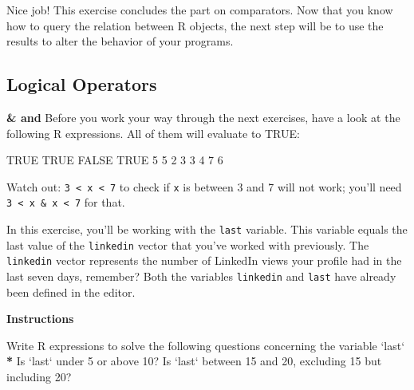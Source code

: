 \documentclass[]{article}
\newcommand{\hlnum}[1]{\textcolor[rgb]{0.816,0.125,0.439}{#1}}%
\newcommand{\hlstr}[1]{\textcolor[rgb]{0.251,0.627,0.251}{#1}}%
\newcommand{\hlstd}[1]{\textcolor[rgb]{0.251,0.251,0.251}{#1}}%
\newcommand{\hlkwc}[1]{\textcolor[rgb]{0.251,0.251,0.251}{#1}}%
\newenvironment{Shaded}{\begin{myshaded}}{\end{myshaded}}
\newcommand{\DataTypeTok}[1]{\hlkwc{#1}}
\newcommand{\DecValTok}[1]{\hlnum{#1}}
\newcommand{\StringTok}[1]{\hlstr{#1}}
\newcommand{\OtherTok}[1]{{#1}}
\newcommand{\ErrorTok}[1]{\textbf{{#1}}}
\newcommand{\NormalTok}[1]{\hlstd{#1}}
\begin{document}
Nice job! This exercise concludes the part on comparators. Now that you
know how to query the relation between R objects, the next step will be
to use the results to alter the behavior of your programs.

\subsection{Logical Operators}\label{logical-operators}

\textbf{\& and \textbar{}} Before you work your way through the next
exercises, have a look at the following R expressions. All of them will
evaluate to TRUE:

\begin{Shaded}
\begin{Highlighting}[]
\OtherTok{TRUE} \OperatorTok{&}\StringTok{ }\OtherTok{TRUE}
\OtherTok{FALSE} \OperatorTok{|}\StringTok{ }\OtherTok{TRUE}
\DecValTok{5} \OperatorTok{<=}\StringTok{ }\DecValTok{5} \OperatorTok{&}\StringTok{ }\DecValTok{2} \OperatorTok{<}\StringTok{ }\DecValTok{3}
\DecValTok{3} \OperatorTok{<}\StringTok{ }\DecValTok{4} \OperatorTok{|}\StringTok{ }\DecValTok{7} \OperatorTok{<}\StringTok{ }\DecValTok{6}
\end{Highlighting}
\end{Shaded}

Watch out: \texttt{3\ \textless{}\ x\ \textless{}\ 7} to check if
\texttt{x} is between 3 and 7 will not work; you'll need
\texttt{3\ \textless{}\ x\ \&\ x\ \textless{}\ 7} for that.

In this exercise, you'll be working with the \texttt{last} variable.
This variable equals the last value of the \texttt{linkedin} vector that
you've worked with previously. The \texttt{linkedin} vector represents
the number of LinkedIn views your profile had in the last seven days,
remember? Both the variables \texttt{linkedin} and \texttt{last} have
already been defined in the editor.

\textbf{Instructions}

\begin{Shaded}
\begin{Highlighting}[]
\NormalTok{Write R expressions to solve the following questions concerning the variable }\StringTok{`}\DataTypeTok{last}\StringTok{`}\OperatorTok{:}
\StringTok{  }
\StringTok{  }\ErrorTok{*}\StringTok{ }\NormalTok{Is }\StringTok{`}\DataTypeTok{last}\StringTok{`}\NormalTok{ under }\DecValTok{5}\NormalTok{ or above }\DecValTok{10}\NormalTok{?}
\OperatorTok{*}\StringTok{ }\NormalTok{Is }\StringTok{`}\DataTypeTok{last}\StringTok{`}\NormalTok{ between }\DecValTok{15}\NormalTok{ and }\DecValTok{20}\NormalTok{, excluding }\DecValTok{15}\NormalTok{ but including }\DecValTok{20}\NormalTok{?}
\end{Highlighting}
\end{Shaded}
\end{document}

